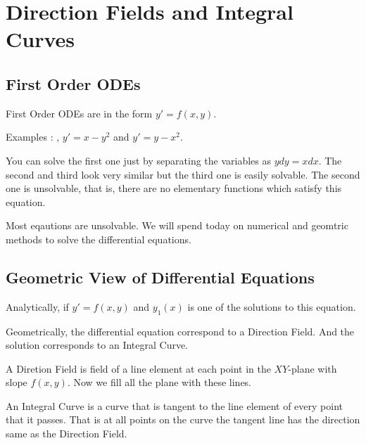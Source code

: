 

\chapter{Direction Fields and Integral Curves}

\bigbreak
\section{First Order ODEs}

First Order ODEs are in the form $y' = f(x, y)$.

Examples : , $y ' = x - y^2$ and $y' = y - x^2$.

You can solve the first one just by separating the variables as $y dy = x dx$.
The second and third look very similar but the third one is easily solvable.
The second one is unsolvable, that is, there are no elementary functions which satisfy this equation.

Most eqautions are unsolvable. We will spend today on numerical and geomtric methods to solve the differential equations.

\section{Geometric View of Differential Equations}

Analytically, if $y' = f(x, y)$ and $y_1(x)$ is one of the solutions to this equation.

Geometrically, the differential equation correspond to a Direction Field.
And the solution corresponds to an Integral Curve.

A Diretion Field is field of a line element at each point in the $XY$-plane with slope $f(x, y)$.
Now we fill all the plane with these lines.

An Integral Curve is a curve that is tangent to the line element of every point that it passes.
That is at all points on the curve the tangent line has the direction same as the Direction Field.

